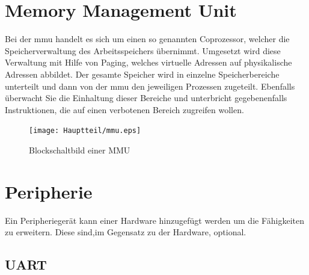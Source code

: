 \section{Memory Management Unit}\label{kap:mmu}

Bei der \ac{mmu} handelt es sich um einen so genannten Coprozessor, welcher die Speicherverwaltung des Arbeitsspeichers übernimmt. Umgesetzt wird diese Verwaltung mit
Hilfe von Paging, welches virtuelle Adressen auf physikalische Adressen abbildet. Der gesamte Speicher wird in einzelne Speicherbereiche unterteilt und dann von der
\ac{mmu} den jeweiligen Prozessen zugeteilt. Ebenfalls überwacht Sie die Einhaltung dieser Bereiche und unterbricht gegebenenfalls Instruktionen, die auf einen verbotenen
Bereich zugreifen wollen.\cite{itwissen}\\

\begin{figure}[H]
\centering
\texttt{[image: Hauptteil/mmu.eps]}
\caption{Blockschaltbild einer MMU}\label{fig:mmu}
\end{figure}


 \section{Peripherie}\label{kap:peripherie}
 Ein Peripheriegerät kann einer Hardware hinzugefügt werden um die Fähigkeiten zu erweitern. Diese sind,im Gegensatz zu der Hardware, optional.

\subsection{UART}\label{kap:uart}

